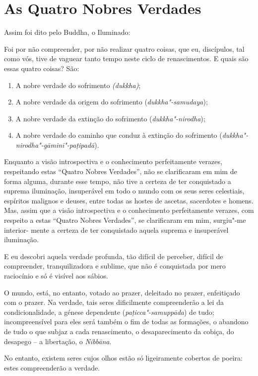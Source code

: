 \chapter{As Quatro Nobres Verdades}

Assim foi dito pelo Buddha, o Iluminado:

Foi por não compreender, por não realizar quatro coisas, que eu, discípulos, tal
como vós, tive de vaguear tanto tempo neste ciclo de renascimentos. E quais são
essas quatro coisas? São:

\begin{enumerate}
  \item A nobre verdade do sofrimento \emph{(dukkha)};

  \item A nobre verdade da origem do sofrimento (\emph{dukkha"-samudaya});

  \item A nobre verdade da extinção do sofrimento (\emph{dukkha"-nirodha});

  \item A nobre verdade do caminho que conduz à extinção do sofrimento (\emph{dukkha"-nirodha"-gāminī"-paṭipadā}).
\end{enumerate}


Enquanto a visão introspectiva e o conhecimento perfeitamente verazes,
respeitando estas ``Quatro Nobres Verdades'', não se clarificaram em mim de
forma alguma, durante esse tempo, não tive a certeza de ter conquistado a
suprema iluminação, insuperável em todo o mundo com os seus seres celestiais,
espíritos malignos e deuses, entre todas as hostes de ascetas, sacerdotes e
homens. Mas, assim que a visão introspectiva e o conhecimento perfeitamente
verazes, com respeito a estas ``Quatro Nobres Verdades'', se clarificaram em
mim, surgiu"-me interior- mente a certeza de ter conquistado aquela suprema e
insuperável iluminação.


E eu descobri aquela verdade profunda, tão difícil de perceber, difícil de
compreender, tranquilizadora e sublime, que não é conquistada por mero
raciocínio e só é visível aos sábios.


O mundo, está, no entanto, votado ao prazer, deleitado no prazer, enfeitiçado
com o prazer. Na verdade, tais seres dificilmente compreenderão a lei da
condicionalidade, a génese dependente (\emph{paṭicca"-samuppāda}) de tudo;
incompreensível para eles será também o fim de todas as formações, o abandono de
tudo o que subjaz a cada renascimento, o desaparecimento da cobiça, do desapego
-- a libertação, o \emph{Nibbāna}.

No entanto, existem seres cujos olhos estão só ligeiramente cobertos de poeira:
estes compreenderão a verdade.

